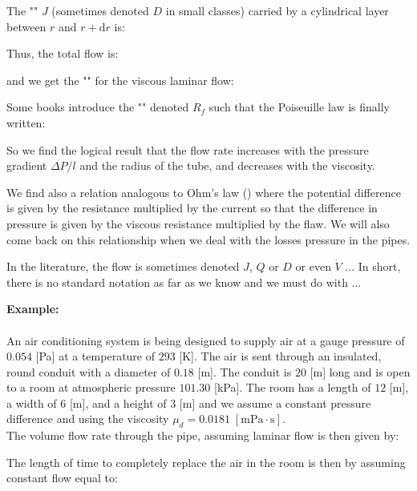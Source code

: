 	The "" $J$ (sometimes denoted $D$ in small classes) carried by a cylindrical layer between $r$ and $r + \mathrm{d}r$ is:
	
	Thus, the total flow is:
	
	and we get the "" for the viscous laminar flow:
	
	Some books introduce the "" denoted $R_f$ such that the Poiseuille law is finally written:
	
	So we find the logical result that the flow rate increases with the pressure gradient $\Delta P/l$ and the radius of the tube, and decreases with the viscosity.

	We find also a relation analogous to Ohm's law () where the potential difference is given by the resistance multiplied by the current so that the difference in pressure is given by the viscous resistance multiplied by the flaw. We will also come back on this relationship when we deal with the losses pressure in the pipes.
	
	\begin{tcolorbox}[title=Remark,colframe=black,arc=10pt]
	In the literature, the flow is sometimes denoted $J$, $Q$ or $D$ or even $\dot{V}$ ... In short, there is no standard notation as far as we know and we must do with ...
	\end{tcolorbox}
	
	\begin{tcolorbox}[colframe=black,colback=white,sharp corners]
	\textbf{{\Large {}}Example:}\\\\
	An air conditioning system is being designed to supply air at a gauge pressure of $0.054$ [Pa] at a temperature of $293$ [K]. The air is sent through an insulated, round conduit with a diameter of $0.18$ [m]. The conduit is $20$ [m] long and is open to a room at atmospheric pressure $101.30$ [kPa]. The room has a length of $12$ [m], a width of $6$ [m], and a height of $3$ [m] and we assume a constant pressure difference and using the viscosity $\mu_d= 0.0181\;[\text{mPa}\cdot\text{s}]$.\\ 

	The volume flow rate through the pipe, assuming laminar flow is then given by:
	
	The length of time to completely replace the air in the room is then by assuming constant flow equal to:
	
	\end{tcolorbox}
	
